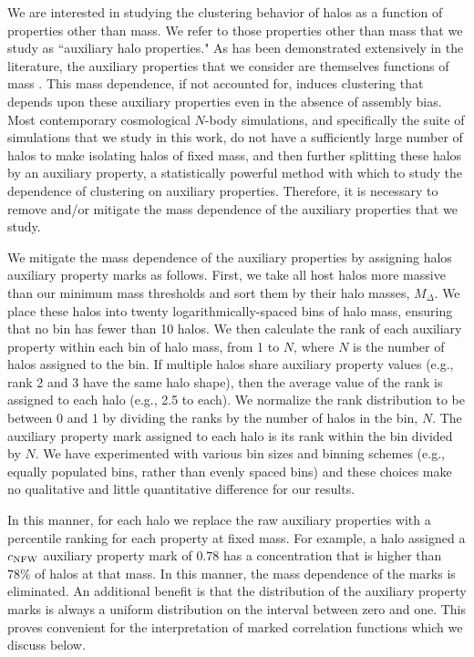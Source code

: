 \documentclass[usenatbib,fleqn]{mnras}
\begin{document}
We are interested in studying the clustering behavior of halos as a function of 
properties other than mass. We refer to those properties other than mass that we study as ``auxiliary halo properties." As has been demonstrated extensively in the literature, the auxiliary properties that we consider are themselves functions of mass \citep{bullock_etal02,allgood_etal06, duffy_etal08, despali_etal16}. This mass dependence, if not accounted for, induces clustering that depends upon these auxiliary properties even in the absence of assembly bias. Most contemporary cosmological $N$-body simulations, and specifically the suite of simulations that we study in this work, do not have a sufficiently large number of halos to make isolating halos of fixed mass, and then further splitting these halos by an auxiliary property, a statistically powerful method with which to study the dependence of clustering on auxiliary properties. Therefore, it is necessary to remove and/or mitigate the mass dependence of the auxiliary properties that we study. 

We mitigate the mass dependence of the auxiliary properties by assigning halos auxiliary property marks as follows. First, we take all host halos more massive than our minimum mass thresholds and sort them by their halo masses, $M_{\Delta}$. We place these halos into twenty logarithmically-spaced bins of halo mass, ensuring that no bin has fewer than 10 halos. We then calculate the rank of each auxiliary property within each bin of halo mass, from 1 to $N$, where $N$ is the number of halos assigned to the bin. If multiple halos share auxiliary property values (e.g., rank 2 and 3 have the same halo shape), then the average value of the rank is assigned to each halo (e.g., 2.5 to each). We normalize the rank distribution to be between 0 and 1 by dividing the ranks by the number of halos in the bin, $N$. The auxiliary property mark assigned to each halo is its rank within the bin divided by $N$. We have experimented with various bin sizes and binning schemes (e.g., equally populated bins, rather than evenly spaced bins) and these choices make no qualitative and little quantitative difference for our results.

In this manner, for each halo we replace the raw auxiliary properties with a percentile ranking for each property at fixed mass. For example, a halo assigned a $c_{\rm NFW}$ auxiliary property mark of $0.78$ has a concentration that is higher than $78\%$ of halos at that mass. In this manner, the mass dependence of the marks is eliminated. An additional benefit is that the distribution of the auxiliary property marks is always a uniform distribution on the interval between zero and one. This proves convenient for the interpretation of marked correlation functions which we discuss below.
\end{document}
